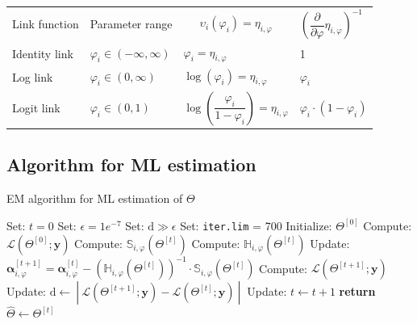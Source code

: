 \documentclass[11pt, a4paper]{article}
\newcommand{\cond}{\!~|~\!}
\begin{document}
\begin{table}[h!]
\centering %
\begin{tabular}{llll} \cmidrule(lr){1-4}\vspace{2pt}
Link function & Parameter range & \multicolumn{1}{c}{$\upsilon_i(\varphi_i) = \eta_{i,\varphi}$} & $\left( \dfrac{\partial}{\partial \varphi} \eta_{i,\varphi} \right)^{-1}$ \\ \cmidrule(lr){1-1} \cmidrule(lr){2-2} \cmidrule(lr){3-3} \cmidrule(lr){4-4} \vspace{2pt}
Identity link & $\varphi_i \in (-\infty, \infty)$ & $\varphi_i = \eta_{i,\varphi}$ & 1 \\
Log link & $\varphi_i \in (0, \infty)$  & $\log(\varphi_i) = \eta_{i,\varphi}$ & $\varphi_i$ \\[7pt] Logit link & $\varphi_i \in (0,1)$ & $\log\left(\dfrac{\varphi_i}{1-\varphi_i}\right) = \eta_{i,\varphi}$ & $\varphi_i \cdot (1-\varphi_i)$ \\[7pt] \cmidrule(lr){1-4}
\end{tabular}%
\label{tab:A0links}
\end{table}

\subsection{Algorithm for ML estimation}

\begin{algorithm}[ht]
\caption{EM algorithm for ML estimation of $\Theta$}\label{alg:EMalg}
\begin{algorithmic}
\State Set: $t = 0$
\State Set: $\epsilon = 1e^{-7}$
\State Set: $\text{d} \gg \epsilon$
\State Set: \texttt{iter.lim} = 700
\State Initialize: $\Theta^{[0]}$ 
\State Compute: $\mathcal{L}(\Theta^{[0]};\mathbf{y})$
\Repeat
{}
\State Compute: $\mathbb{S}_{i,\varphi}(\Theta^{[t]})$ %
\State Compute: $\mathbb{H}_{i,\varphi}(\Theta^{[t]})$ %
\State Update: $\bm{\alpha}_{i,\varphi}^{[t+1]} = \bm{\alpha}_{i,\varphi}^{[t]} - \left(\mathbb{H}_{i,\varphi}(\Theta^{[t]})\right)^{-1} \cdot \mathbb{S}_{i,\varphi}(\Theta^{[t]})$
\EndFor
\EndFor
\State Compute: $\mathcal{L}(\Theta^{[t+1]};\mathbf{y})$
\State Update: $\text{d} \gets \cond \mathcal{L}(\Theta^{[t+1]};\mathbf{y}) -  \mathcal{L}(\Theta^{[t]};\mathbf{y}) \cond$
\State Update: $t \gets t+1$
\State \textbf{return} $\hat{\Theta} \gets \Theta^{[t]}$
\end{algorithmic}
\end{algorithm}
\end{document}
